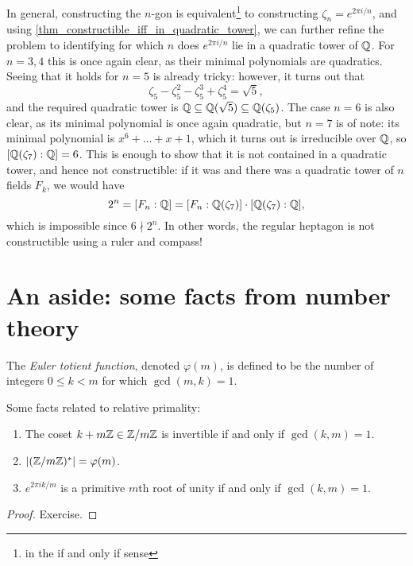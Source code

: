 In general, constructing the $n$-gon is equivalent\footnote{in the if and only if sense} to constructing $\zeta_n = e^{2 \pi i/n}$, and using \cref{thm_constructible_iff_in_quadratic_tower}, we can further refine the problem to identifying for which $n$ does $e^{2 \pi i/n}$ lie in a quadratic tower of $\mathbb{{Q}}$. For $n = 3, 4$ this is once again clear, as their minimal polynomials are quadratics. Seeing that it holds for $n = 5$ is already tricky: however, it turns out that
\[
    \zeta_5 - \zeta_5^2 - \zeta_5^3 + \zeta_5^4 = \sqrt{5},
\]
and the required quadratic tower is $\mathbb{{Q}} \subseteq \mathbb{{Q}}(\sqrt{5}) \subseteq \mathbb{{Q}}(\zeta_5)$. The case $n = 6$ is also clear, as its minimal polynomial is once again quadratic, but $n = 7$ is of note: its minimal polynomial is $x^6 + \ldots + x + 1$, which it turns out is irreducible over $\mathbb{{Q}}$, so $[\mathbb{{Q}}(\zeta_7) : \mathbb{{Q}}] = 6$. This is enough to show that it is not contained in a quadratic tower, and hence not constructible: if it was and there was a quadratic tower of $n$ fields $F_k$, we would have
\[
    2^n = [F_n : \mathbb{{Q}}] = [F_n : \mathbb{{Q}}(\zeta_7)] \cdot [\mathbb{{Q}}(\zeta_7) : \mathbb{{Q}}],
\]
which is impossible since $6 \nmid 2^n$. In other words, the regular heptagon is not constructible using a ruler and compass!

\section{An aside: some facts from number theory}

\begin{definition}
   The \emph{Euler totient function}, denoted $\varphi(m)$, is defined to be the number of integers $0 \leq k < m$ for which $\gcd(m, k) = 1$.
\end{definition}

\begin{proposition}
    Some facts related to relative primality:
    \begin{enumerate}[label=(\alph*)]
        \item The coset $k + m\mathbb{{Z}} \in \mathbb{{Z}}/{{m}}\mathbb{{Z}}$ is invertible if and only if $\gcd(k, m) = 1$.
        \item $|(\mathbb{{Z}}/{{m}}\mathbb{{Z}})^*| = \varphi(m)$.
        \item $e^{2 \pi i k/m}$ is a primitive $m$th root of unity if and only if $\gcd(k, m) = 1$.
    \end{enumerate}
\end{proposition}

\begin{proof}
    Exercise.
\end{proof}

